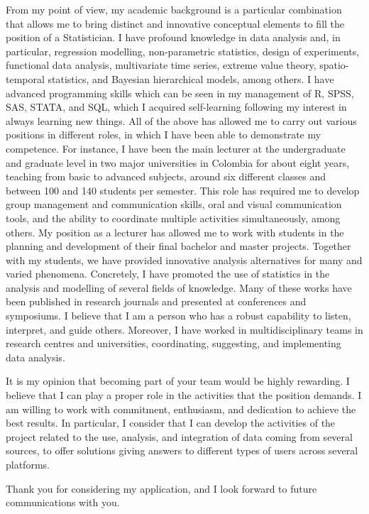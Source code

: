 \documentclass[11pt, a4paper]{awesome-cv}
\begin{document}
\begin{cvletter}
From my point of view, my academic background is a particular combination that allows me to bring distinct and innovative conceptual elements to fill the position of a Statistician. I have profound knowledge in data analysis and, in particular, regression modelling, non-parametric statistics, design of experiments,  functional data analysis, multivariate time series, extreme value theory, spatio-temporal statistics, and  Bayesian hierarchical models, among others. I have advanced programming skills which can be seen in my management of R, SPSS, SAS, STATA, and SQL, which I acquired self-learning following my interest in always learning new things. All of the above has allowed me to carry out various positions in different roles, in which I have been able to demonstrate my competence. For instance, I have been the main lecturer at the undergraduate and graduate level in two major universities in Colombia for about eight years, teaching from basic to advanced subjects, around six different classes and between 100 and 140 students per semester. This role has required me to develop group management and communication skills, oral and visual communication tools, and the ability to coordinate multiple activities simultaneously, among others. My position as a lecturer has allowed me to work with students in the planning and development of their final bachelor and master projects. Together with my students, we have provided innovative analysis alternatives for many and varied phenomena. Concretely, I have promoted the use of statistics in the analysis and modelling of several fields of knowledge. Many of these works have been published in research journals and presented at conferences and symposiums. I believe that I am a person who has a robust capability to listen, interpret, and guide others. Moreover, I have worked in multidisciplinary teams in research centres and universities, coordinating, suggesting, and implementing data analysis. \par
It is my opinion that becoming part of your team would be highly rewarding. I believe that I can play a proper role in the activities that the position demands. I am willing to work with commitment, enthusiasm, and dedication to achieve the best results. In particular, I consider that I can develop the activities of the project related to the use, analysis, and integration of data coming from several sources, to offer solutions giving answers to different types of users across several platforms.\par\bigskip
Thank you for considering my application, and I look forward to future communications with you.
\end{cvletter}


\makeletterclosing
\end{document}
